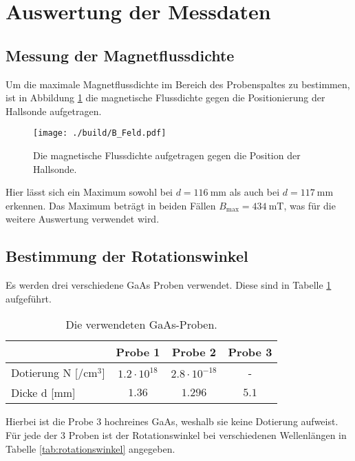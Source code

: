 \section{Auswertung der Messdaten}
\label{sec:Auswertung}
\subsection{Messung der Magnetflussdichte}
\label{subsec:Magnetflussdichte}
Um die maximale Magnetflussdichte im Bereich des Probenspaltes zu bestimmen,
ist in Abbildung \ref{fig:Magnetflussdichte} die magnetische Flussdichte gegen die Positionierung
der Hallsonde aufgetragen.
\begin{figure}[h]
  \centering
  \texttt{[image: ./build/B\_Feld.pdf]}
  \caption{Die magnetische Flussdichte aufgetragen gegen die Position der Hallsonde.}
  \label{fig:Magnetflussdichte}
\end{figure}
\noindent
Hier lässt sich ein Maximum sowohl bei $d=\SI{116}{\milli\meter}$ als auch bei
$d=\SI{117}{\milli\meter}$ erkennen. Das Maximum beträgt in beiden Fällen
$B_{\text{max}}=\SI{434}{\milli\tesla}$, was für die weitere Auswertung verwendet wird.

\subsection{Bestimmung der Rotationswinkel}
\label{subsec:rotationswinkel}
Es werden drei verschiedene GaAs Proben verwendet. Diese sind in Tabelle \ref{tab:proben}
aufgeführt.

\begin{table}[H]
  \centering
  \caption{Die verwendeten GaAs-Proben.}
  \label{tab:proben}
  \begin{tabular}{l c c c}
    \toprule
    {} & {Probe 1} & {Probe 2} & {Probe 3} \\
    \midrule
    Dotierung N [$\si{\per\centi\meter\cubed}$] & $ 1.2 \cdot 10^{18}$ & $2.8 \cdot 10^{-18}$ & - \\
    Dicke d [$\si{\milli\meter}$] & $1.36$ & $1.296$ & $5.1$ \\
    \bottomrule
  \end{tabular}
\end{table}
\noindent
Hierbei ist die Probe 3 hochreines GaAs, weshalb sie keine Dotierung aufweist.
Für jede der 3 Proben ist der Rotationswinkel bei verschiedenen Wellenlängen in
Tabelle \ref{tab:rotationswinkel} angegeben.

